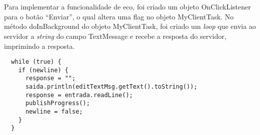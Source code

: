\documentclass[a4paper,10pt,oneside,final,titlepage,onecolumn]{article}
\begin{document}
\FloatBarrier
\section{}
\paragraph{}Para implementar a funcionalidade de eco, foi criado um objeto OnClickListener para o botão ``Enviar'', o qual altera uma flag no objeto MyClientTask. No método doInBackground do objeto MyClientTask, foi criado um \emph{loop} que envia ao servidor a \emph{string} do campo TextMessage e recebe a resposta do servidor, imprimindo a resposta.
\begin{lstlisting}
  while (true) {
    if (newline) {
      response = "";
      saida.println(editTextMsg.getText().toString());
      response = entrada.readLine(); 
      publishProgress();
      newline = false;
    }
  }
\end{lstlisting}
\end{document}
